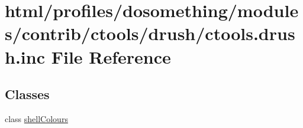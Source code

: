 \hypertarget{ctools_8drush_8inc}{
\section{html/profiles/dosomething/modules/contrib/ctools/drush/ctools.drush.inc File Reference}
\label{ctools_8drush_8inc}
}
\subsection*{Classes}
\begin{DoxyCompactItemize}
\item 
class \hyperlink{classshellColours}{shellColours}
\end{DoxyCompactItemize}
